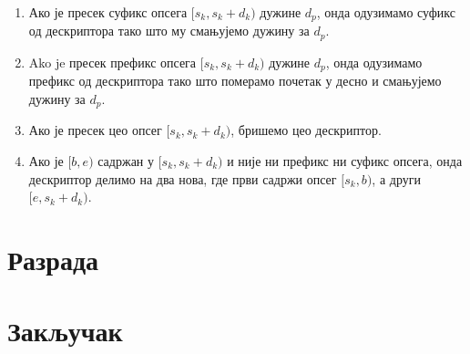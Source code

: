 \documentclass[12pt,oneside]{memoir}
\begin{document}
\begin{enumerate}
	\item Ако је пресек суфикс опсега \([s_k, s_k+d_k)\) дужине \(d_p\), онда одузимамо суфикс 
	од дескриптора тако што му смањујемо дужину за \(d_p\).
	
	\item Ako je пресек префикс опсега \([s_k, s_k+d_k)\) дужине \(d_p\), онда одузимамо префикс
	 од дескриптора тако што померамо почетак у десно и смањујемо дужину за \(d_p\).
	 
	\item Ако је пресек цео опсег \([s_k, s_k+d_k)\), бришемо цео дескриптор.
	 
	\item Ако је \([b, e)\) садржан у \([s_k, s_k+d_k)\) и није ни префикс ни суфикс опсега,
	онда дескриптор делимо на два нова, где први садржи опсег \([s_k, b)\), а други 
	\([e, s_k+d_k)\).
\end{enumerate}



\chapter{Разрада}
\label{chp:razrada}

\pangrami

\pangrami

\chapter{Закључак}
\pangrami

\pangrami

\literatura

\backmatter
\end{document}
